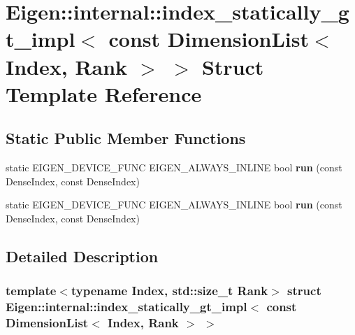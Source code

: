 \hypertarget{struct_eigen_1_1internal_1_1index__statically__gt__impl_3_01const_01_dimension_list_3_01_index_00_01_rank_01_4_01_4}{}\section{Eigen\+:\+:internal\+:\+:index\+\_\+statically\+\_\+gt\+\_\+impl$<$ const Dimension\+List$<$ Index, Rank $>$ $>$ Struct Template Reference}
\label{struct_eigen_1_1internal_1_1index__statically__gt__impl_3_01const_01_dimension_list_3_01_index_00_01_rank_01_4_01_4}
\subsection*{Static Public Member Functions}
\begin{DoxyCompactItemize}
\item 
\mbox{\label{struct_eigen_1_1internal_1_1index__statically__gt__impl_3_01const_01_dimension_list_3_01_index_00_01_rank_01_4_01_4_a3f06701eedc85c55525190f6352c1626}} 
static E\+I\+G\+E\+N\+\_\+\+D\+E\+V\+I\+C\+E\+\_\+\+F\+U\+NC E\+I\+G\+E\+N\+\_\+\+A\+L\+W\+A\+Y\+S\+\_\+\+I\+N\+L\+I\+NE bool {\bfseries run} (const Dense\+Index, const Dense\+Index)
\item 
\mbox{\label{struct_eigen_1_1internal_1_1index__statically__gt__impl_3_01const_01_dimension_list_3_01_index_00_01_rank_01_4_01_4_a3f06701eedc85c55525190f6352c1626}} 
static E\+I\+G\+E\+N\+\_\+\+D\+E\+V\+I\+C\+E\+\_\+\+F\+U\+NC E\+I\+G\+E\+N\+\_\+\+A\+L\+W\+A\+Y\+S\+\_\+\+I\+N\+L\+I\+NE bool {\bfseries run} (const Dense\+Index, const Dense\+Index)
\end{DoxyCompactItemize}


\subsection{Detailed Description}
\subsubsection*{template$<$typename Index, std\+::size\+\_\+t Rank$>$\newline
struct Eigen\+::internal\+::index\+\_\+statically\+\_\+gt\+\_\+impl$<$ const Dimension\+List$<$ Index, Rank $>$ $>$}



